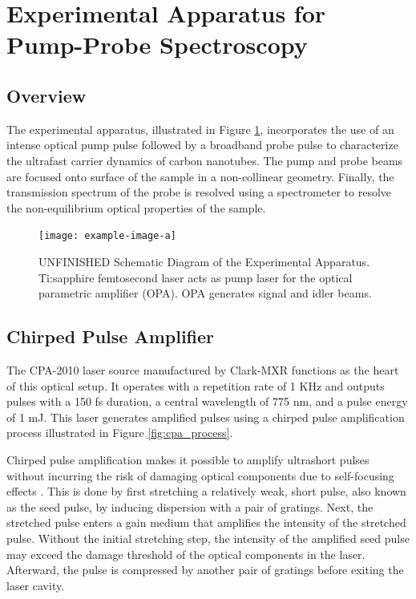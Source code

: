 \section{Experimental Apparatus for Pump-Probe Spectroscopy}

\subsection{Overview}
The experimental apparatus, illustrated in Figure \ref{fig:setup_schematic}, incorporates the use of an intense optical pump pulse followed by a broadband probe pulse to characterize the ultrafast carrier dynamics of carbon nanotubes. The pump and probe beams are focused onto surface of the sample in a non-collinear geometry. Finally, the transmission spectrum of the probe is resolved using a spectrometer to resolve the non-equilibrium optical properties of the sample.  


\begin{figure}[h]
	\centering
	\texttt{[image: example-image-a]}
	\caption{{ \color{red} UNFINISHED} Schematic Diagram of the Experimental Apparatus. Ti:sapphire femtosecond laser acts as pump laser for the optical parametric amplifier (OPA). OPA generates signal and idler beams.  }
	\label{fig:setup_schematic}
\end{figure}


\subsection{Chirped Pulse Amplifier}
The CPA-2010 laser source manufactured by Clark-MXR functions as the heart of this optical setup. It operates with a repetition rate of 1 KHz and outputs pulses with a 150 fs duration, a central wavelength of 775 nm, and a pulse energy of 1 mJ. This laser generates amplified pulses using a chirped pulse amplification process illustrated in Figure \ref{fig:cpa_process}. 

Chirped pulse amplification makes it possible to amplify ultrashort pulses without incurring the risk of damaging optical components due to self-focusing effects \cite{strickland1985compression}. This is done by first stretching a relatively weak, short pulse, also known as the seed pulse, by inducing dispersion with a pair of gratings. Next, the stretched pulse enters a gain medium that amplifies the intensity of the stretched pulse. Without the initial stretching step, the intensity of the amplified seed pulse may exceed the damage threshold of the optical components in the laser. Afterward, the pulse is compressed by another pair of gratings before exiting the laser cavity. 

